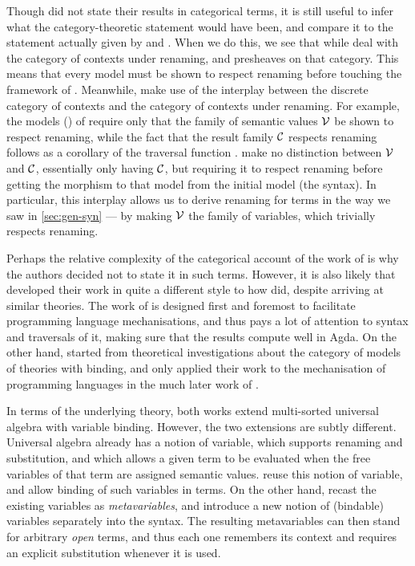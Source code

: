 Though \citet{AACMM21} did not state their results in categorical terms, it is
still useful to infer what the category-theoretic statement would have been, and
compare it to the statement actually given by \citet{FPT99} and \citet{FS22}.
When we do this, we see that while \citeauthor{FPT99} deal with the category of
contexts under renaming, and presheaves on that category.
This means that every model must be shown to respect renaming before touching
the framework of \citeauthor{FS22}.
Meanwhile, \citeauthor{AACMM21} make use of the interplay between the discrete
category of contexts and the category of contexts under renaming.
For example, the models () of \citet{AACMM21} require only
that the family of semantic values $\mathcal V$ be shown to respect renaming, while the
fact that the result family $\mathcal C$ respects renaming follows as a corollary of the
traversal function .
 make no distinction between $\mathcal V$ and $\mathcal C$, essentially only
having $\mathcal C$, but requiring it to respect renaming before getting the morphism
to that model from the initial model (the syntax).
In particular, this interplay allows us to derive renaming for terms in the way
we saw in \cref{sec:gen-syn} --- by making $\mathcal V$ the family of variables, which
trivially respects renaming.

Perhaps the relative complexity of the categorical account of the work of
\citet{AACMM21} is why the authors decided not to state it in such terms.
However, it is also likely that \citeauthor{AACMM21} developed their work in
quite a different style to how \citeauthor{FPT99} did, despite arriving at
similar theories.
The work of \citet{AACMM21} is designed first and foremost to facilitate
programming language mechanisations, and thus pays a lot of attention to syntax
and traversals of it, making sure that the results compute well in Agda.
On the other hand, \citeauthor{FPT99} started from theoretical investigations
about the category of models of theories with binding, and only applied their
work to the mechanisation of programming languages in the much later work of
\citet{FS22}.

In terms of the underlying theory, both works extend multi-sorted universal
algebra with variable binding.
However, the two extensions are subtly different.
Universal algebra already has a notion of variable, which supports renaming and
substitution, and which allows a given term to be evaluated when the free
variables of that term are assigned semantic values.
\citeauthor{AACMM21} reuse this notion of variable, and allow binding of such
variables in terms.
On the other hand, \citeauthor{FS22} recast the existing variables as
\emph{metavariables}, and introduce a new notion of (bindable) variables
separately into the syntax.
The resulting metavariables can then stand for arbitrary \emph{open} terms, and
thus each one remembers its context and requires an explicit substitution
whenever it is used.

